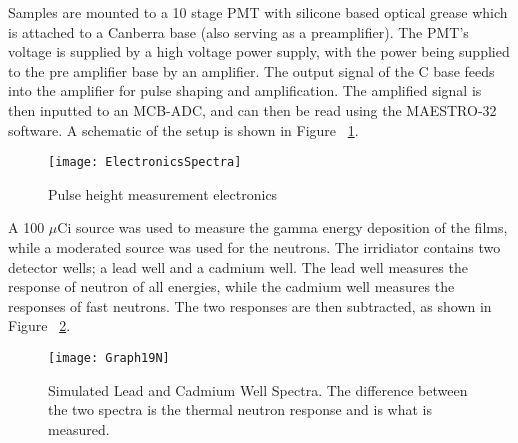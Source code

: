 \documentclass[draftcls,onecolumn]{IEEEtran}
\begin{document}
Samples are mounted to a 10 stage PMT with silicone based optical grease which is attached to a Canberra base (also serving as a preamplifier).   
The PMT's voltage is supplied by a high voltage power supply, with the power being supplied to the pre amplifier base by an amplifier.  
The output signal of the C base feeds into the amplifier for pulse shaping and amplification. 
The amplified signal is then inputted to an MCB-ADC, and can then be read using the MAESTRO-32 software. 
A schematic of the setup is shown in Figure ~\ref{fig:ElectronicsSpectra}.
\begin{figure}
	\centering
	\texttt{[image: ElectronicsSpectra]}
	\caption{Pulse height measurement electronics}
	\label{fig:ElectronicsSpectra}
\end{figure}
A 100 $\mu$Ci  source was used to measure the gamma energy deposition of the films, while a moderated  source was used for the neutrons.
The  irridiator contains two detector wells; a lead well and a cadmium well.
The lead well measures the response of neutron of all energies, while the cadmium well measures the responses of fast neutrons.
The two responses are then subtracted, as shown in Figure ~\ref{fig:SimPbCdSpectra}.
\begin{figure}
	\centering
	\texttt{[image: Graph19N]}
	\caption{Simulated Lead and Cadmium Well Spectra. The difference between the two spectra is the thermal neutron response and is what is measured.}
	\label{fig:SimPbCdSpectra}
\end{figure}
\end{document}
